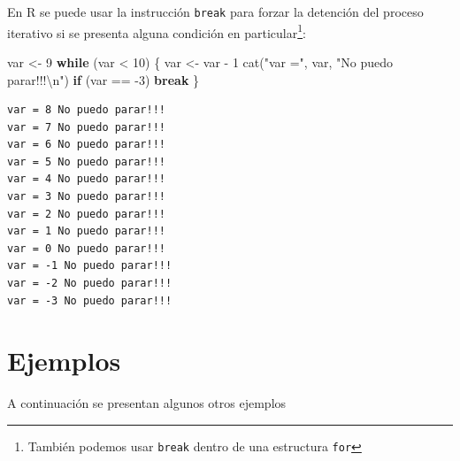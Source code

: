 \documentclass[
]{book}
\newenvironment{Shaded}{\begin{snugshade}}{\end{snugshade}}
\newcommand{\ControlFlowTok}[1]{\textcolor[rgb]{0.13,0.29,0.53}{\textbf{#1}}}
\newcommand{\DecValTok}[1]{\textcolor[rgb]{0.00,0.00,0.81}{#1}}
\newcommand{\FunctionTok}[1]{\textcolor[rgb]{0.00,0.00,0.00}{#1}}
\newcommand{\NormalTok}[1]{#1}
\newcommand{\OtherTok}[1]{\textcolor[rgb]{0.56,0.35,0.01}{#1}}
\newcommand{\SpecialCharTok}[1]{\textcolor[rgb]{0.00,0.00,0.00}{#1}}
\newcommand{\StringTok}[1]{\textcolor[rgb]{0.31,0.60,0.02}{#1}}
\begin{document}
En R se puede usar la instrucción \texttt{break} para forzar la detención del proceso iterativo si se presenta alguna condición en particular\footnote{También podemos usar \texttt{break} dentro de una estructura \texttt{for}}:

\begin{Shaded}
\begin{Highlighting}[]
\NormalTok{var }\OtherTok{\textless{}{-}} \DecValTok{9}
\ControlFlowTok{while}\NormalTok{ (var }\SpecialCharTok{\textless{}} \DecValTok{10}\NormalTok{) \{}
\NormalTok{    var }\OtherTok{\textless{}{-}}\NormalTok{ var }\SpecialCharTok{{-}} \DecValTok{1}
    \FunctionTok{cat}\NormalTok{(}\StringTok{"var ="}\NormalTok{, var, }\StringTok{"No puedo parar!!!}\SpecialCharTok{\textbackslash{}n}\StringTok{"}\NormalTok{)}
    \ControlFlowTok{if}\NormalTok{ (var }\SpecialCharTok{==} \SpecialCharTok{{-}}\DecValTok{3}\NormalTok{) }\ControlFlowTok{break}
\NormalTok{\}}
\end{Highlighting}
\end{Shaded}

\begin{verbatim}
var = 8 No puedo parar!!!
var = 7 No puedo parar!!!
var = 6 No puedo parar!!!
var = 5 No puedo parar!!!
var = 4 No puedo parar!!!
var = 3 No puedo parar!!!
var = 2 No puedo parar!!!
var = 1 No puedo parar!!!
var = 0 No puedo parar!!!
var = -1 No puedo parar!!!
var = -2 No puedo parar!!!
var = -3 No puedo parar!!!
\end{verbatim}

\hypertarget{ejemplos}{%
\section{Ejemplos}\label{ejemplos}}

A continuación se presentan algunos otros ejemplos
\end{document}
